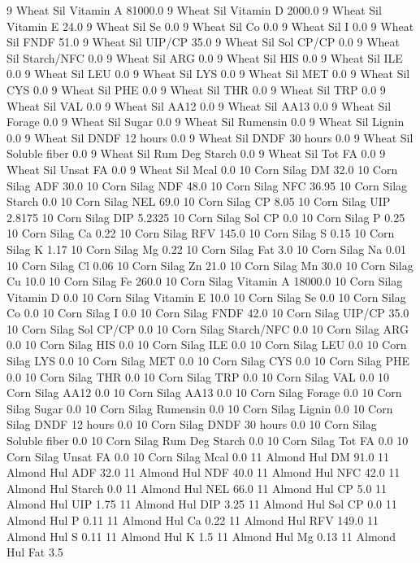 \documentclass[letterpaper,10pt,english]{sphinxmanual}
\begin{document}
\begin{sphinxVerbatim}[commandchars=\\\{\},numbers=left,firstnumber=1,stepnumber=1]
9 Wheat Sil Vitamin A 81000.0
9 Wheat Sil Vitamin D 2000.0
9 Wheat Sil Vitamin E 24.0
9 Wheat Sil Se 0.0
9 Wheat Sil Co 0.0
9 Wheat Sil I 0.0
9 Wheat Sil FNDF 51.0
9 Wheat Sil UIP/CP 35.0
9 Wheat Sil Sol CP/CP 0.0
9 Wheat Sil Starch/NFC 0.0
9 Wheat Sil ARG 0.0
9 Wheat Sil HIS 0.0
9 Wheat Sil ILE 0.0
9 Wheat Sil LEU 0.0
9 Wheat Sil LYS 0.0
9 Wheat Sil MET 0.0
9 Wheat Sil CYS 0.0
9 Wheat Sil PHE 0.0
9 Wheat Sil THR 0.0
9 Wheat Sil TRP 0.0
9 Wheat Sil VAL 0.0
9 Wheat Sil AA\PYGZsh{}12 0.0
9 Wheat Sil AA\PYGZsh{}13 0.0
9 Wheat Sil \PYGZpc{} Forage 0.0
9 Wheat Sil Sugar \PYGZpc{} 0.0
9 Wheat Sil Rumensin 0.0
9 Wheat Sil Lignin 0.0
9 Wheat Sil DNDF 12 hours 0.0
9 Wheat Sil DNDF 30 hours 0.0
9 Wheat Sil Soluble fiber 0.0
9 Wheat Sil Rum Deg Starch 0.0
9 Wheat Sil Tot FA 0.0
9 Wheat Sil Unsat FA 0.0
9 Wheat Sil Mcal 0.0
10 Corn Silag DM 32.0
10 Corn Silag ADF 30.0
10 Corn Silag NDF 48.0
10 Corn Silag NFC 36.95
10 Corn Silag Starch 0.0
10 Corn Silag NEL 69.0
10 Corn Silag CP 8.05
10 Corn Silag UIP 2.8175
10 Corn Silag DIP 5.2325
10 Corn Silag Sol CP 0.0
10 Corn Silag P 0.25
10 Corn Silag Ca 0.22
10 Corn Silag RFV 145.0
10 Corn Silag S 0.15
10 Corn Silag K 1.17
10 Corn Silag Mg 0.22
10 Corn Silag Fat 3.0
10 Corn Silag Na 0.01
10 Corn Silag Cl 0.06
10 Corn Silag Zn 21.0
10 Corn Silag Mn 30.0
10 Corn Silag Cu 10.0
10 Corn Silag Fe 260.0
10 Corn Silag Vitamin A 18000.0
10 Corn Silag Vitamin D 0.0
10 Corn Silag Vitamin E 10.0
10 Corn Silag Se 0.0
10 Corn Silag Co 0.0
10 Corn Silag I 0.0
10 Corn Silag FNDF 42.0
10 Corn Silag UIP/CP 35.0
10 Corn Silag Sol CP/CP 0.0
10 Corn Silag Starch/NFC 0.0
10 Corn Silag ARG 0.0
10 Corn Silag HIS 0.0
10 Corn Silag ILE 0.0
10 Corn Silag LEU 0.0
10 Corn Silag LYS 0.0
10 Corn Silag MET 0.0
10 Corn Silag CYS 0.0
10 Corn Silag PHE 0.0
10 Corn Silag THR 0.0
10 Corn Silag TRP 0.0
10 Corn Silag VAL 0.0
10 Corn Silag AA\PYGZsh{}12 0.0
10 Corn Silag AA\PYGZsh{}13 0.0
10 Corn Silag \PYGZpc{} Forage 0.0
10 Corn Silag Sugar \PYGZpc{} 0.0
10 Corn Silag Rumensin 0.0
10 Corn Silag Lignin 0.0
10 Corn Silag DNDF 12 hours 0.0
10 Corn Silag DNDF 30 hours 0.0
10 Corn Silag Soluble fiber 0.0
10 Corn Silag Rum Deg Starch 0.0
10 Corn Silag Tot FA 0.0
10 Corn Silag Unsat FA 0.0
10 Corn Silag Mcal 0.0
11 Almond Hul DM 91.0
11 Almond Hul ADF 32.0
11 Almond Hul NDF 40.0
11 Almond Hul NFC 42.0
11 Almond Hul Starch 0.0
11 Almond Hul NEL 66.0
11 Almond Hul CP 5.0
11 Almond Hul UIP 1.75
11 Almond Hul DIP 3.25
11 Almond Hul Sol CP 0.0
11 Almond Hul P 0.11
11 Almond Hul Ca 0.22
11 Almond Hul RFV 149.0
11 Almond Hul S 0.11
11 Almond Hul K 1.5
11 Almond Hul Mg 0.13
11 Almond Hul Fat 3.5

\end{sphinxVerbatim}
\end{document}
